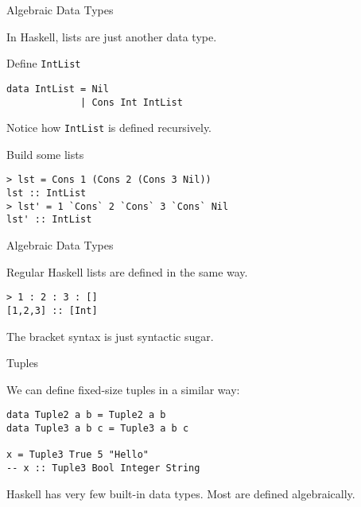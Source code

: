 %
\begin{frame}[fragile]{Algebraic Data Types}

In Haskell, lists are just another data type.

\begin{block}{Define \texttt{IntList}}
\begin{verbatim}
data IntList = Nil
             | Cons Int IntList
\end{verbatim}
\end{block}

Notice how \texttt{IntList} is defined recursively.

\begin{block}{Build some lists}
\begin{verbatim}
> lst = Cons 1 (Cons 2 (Cons 3 Nil))
lst :: IntList
> lst' = 1 `Cons` 2 `Cons` 3 `Cons` Nil
lst' :: IntList
\end{verbatim}
\end{block}

\end{frame}

%
\begin{frame}[fragile]{Algebraic Data Types}

Regular Haskell lists are defined in the same way.

\begin{block}{}
\begin{verbatim}
> 1 : 2 : 3 : []
[1,2,3] :: [Int]
\end{verbatim}
\end{block}

The bracket syntax is just syntactic sugar.

\end{frame}

%
\begin{frame}[fragile]{Tuples}

We can define fixed-size tuples in a similar way:

\begin{block}{}
\begin{verbatim}
data Tuple2 a b = Tuple2 a b
data Tuple3 a b c = Tuple3 a b c

x = Tuple3 True 5 "Hello"
-- x :: Tuple3 Bool Integer String
\end{verbatim}
\end{block}

Haskell has very few built-in data types. Most are defined algebraically.

\end{frame}
